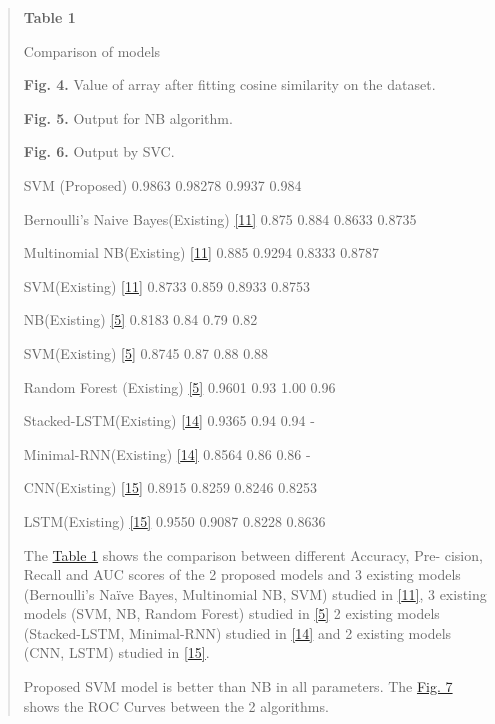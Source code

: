 \documentclass[
]{article}
\begin{document}
\begin{quote}
\protect\hypertarget{_bookmark12}{}{}\textbf{Table 1}

Comparison of models

\textbf{Fig. 4.} Value of array after ﬁtting cosine similarity on the
dataset.

\textbf{Fig. 5.} Output for NB algorithm.

\textbf{Fig. 6.} Output by SVC.

SVM (Proposed) 0.9863 0.98278 0.9937 0.984

Bernoulli's Naive Bayes(E\textsc{x}isting)
\protect\hyperlink{_bookmark31}{{[}11{]}} 0.875 0.884 0.8633 0.8735

Multinomial NB(E\textsc{x}isting)
\protect\hyperlink{_bookmark31}{{[}11{]}} 0.885 0.9294 0.8333 0.8787

SVM(E\textsc{x}isting) \protect\hyperlink{_bookmark31}{{[}11{]}} 0.8733
0.859 0.8933 0.8753

NB(E\textsc{x}isting) \protect\hyperlink{_bookmark25}{{[}5{]}} 0.8183
0.84 0.79 0.82

SVM(E\textsc{x}isting) \protect\hyperlink{_bookmark25}{{[}5{]}} 0.8745
0.87 0.88 0.88

Random Forest (E\textsc{x}isting)
\protect\hyperlink{_bookmark25}{{[}5{]}} 0.9601 0.93 1.00 0.96

Stacked-LSTM(E\textsc{x}isting)
\protect\hyperlink{_bookmark34}{{[}14{]}} 0.9365 0.94 0.94 -

Minimal-RNN(E\textsc{x}isting) \protect\hyperlink{_bookmark34}{{[}14{]}}
0.8564 0.86 0.86 -

CNN(E\textsc{x}isting) \protect\hyperlink{_bookmark35}{{[}15{]}} 0.8915
0.8259 0.8246 0.8253

LSTM(E\textsc{x}isting) \protect\hyperlink{_bookmark35}{{[}15{]}} 0.9550
0.9087 0.8228 0.8636

The \protect\hyperlink{_bookmark12}{Table 1} shows the comparison
between diﬀerent Accuracy, Pre- cision, Recall and AUC scores of the 2
proposed models and 3 existing models (Bernoulli's Naïve Bayes,
Multinomial NB, SVM) studied in
\protect\hyperlink{_bookmark31}{{[}11{]}}, 3 existing models (SVM, NB,
Random Forest) studied in \protect\hyperlink{_bookmark25}{{[}5{]}} 2
existing models (Stacked-LSTM, Minimal-RNN) studied in
\protect\hyperlink{_bookmark34}{{[}14{]}} and 2 existing models (CNN,
LSTM) studied in \protect\hyperlink{_bookmark35}{{[}15{]}}.

Proposed SVM model is better than NB in all parameters. The
\protect\hyperlink{_bookmark16}{Fig. 7} shows the ROC Curves between the
2 algorithms.


\end{quote}
\end{document}

